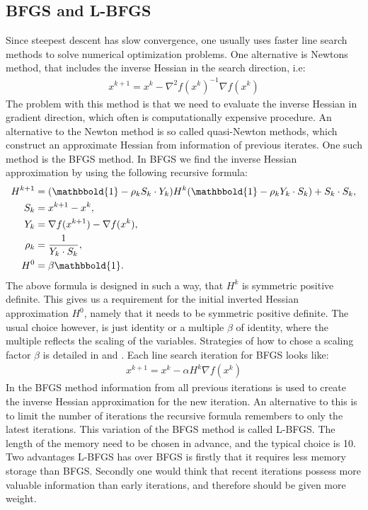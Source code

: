 \subsection{BFGS and L-BFGS}
Since steepest descent has slow convergence, one usually uses faster line search methods to solve numerical optimization problems. One alternative is Newtons method, that includes the inverse Hessian in the search direction, i.e:
\begin{align}
x^{k+1} = x^k - \nabla^2 f(x^k)^{-1}\nabla f(x^k) \label{Newton}
\end{align}
The problem with this method is that we need to evaluate the inverse Hessian in gradient direction, which often is computationally expensive procedure. An alternative to the Newton method is so called quasi-Newton methods, which construct an approximate Hessian from information of previous iterates. One such method is the BFGS method\cite{broyden1970convergence,fletcher1970new,goldfarb1970family, shanno1970conditioning}. In BFGS we find the inverse Hessian approximation by using the following recursive formula:
\begin{align}
H^{k+1} &= (\mathbbold{1}-\rho_kS_k\cdot Y_k)H^k(\mathbbold{1} -\rho_kY_k\cdot S_k) + S_k\cdot S_k, \label{inv_H_apr} \\
S_k &= x^{k+1}-x^{k}, \\
Y_k &= \nabla f(x^{k+1})-\nabla f(x^{k}),\\
\rho_k &= \frac{1}{Y_k\cdot S_k}, \\
H^0&=\beta\mathbbold{1}.
\end{align}
The above formula is designed in such a way, that $H^k$ is symmetric positive definite. This gives us a requirement for the initial inverted Hessian approximation $H^0$, namely that it needs to be symmetric positive definite. The usual choice however, is just identity or a multiple $\beta$ of identity, where the multiple reflects the scaling of the variables. Strategies of how to chose a scaling factor $\beta$ is detailed in \cite{liu1989limited} and  \cite{gilbert1989some}. Each line search iteration for BFGS looks like:
\begin{align}
x^{k+1} = x^k - \alpha H^{k}\nabla f(x^k) \label{BFGS_itr}
\end{align} 
In the BFGS method information from all previous iterations is used to create the inverse Hessian approximation for the new iteration. An alternative to this is to limit the number of iterations the recursive formula remembers to only the latest iterations. This variation of the BFGS method is called L-BFGS\cite{nocedal1980updating}. The length of the memory need to be chosen in advance, and the typical choice is 10. Two advantages L-BFGS has over BFGS is firstly that it requires less memory storage than BFGS. Secondly one would think that recent iterations possess more valuable information than early iterations, and therefore should be given more weight. 
